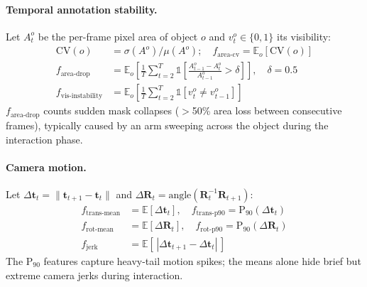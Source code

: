 \paragraph{Temporal annotation stability.}
Let $A^o_t$ be the per-frame pixel area of object $o$ and $v^o_t \in \{0,1\}$ its visibility:
\begin{align}
\text{CV}(o) &= \sigma(A^o)/\mu(A^o); \quad
f_{\text{area-cv}} = \mathbb{E}_o[\text{CV}(o)] \\
f_{\text{area-drop}} &= \mathbb{E}_o\!\left[\frac{1}{T}\textstyle\sum_{t=2}^{T} \mathbb{1}\!\left[\frac{A^o_{t-1} - A^o_t}{A^o_{t-1}} > \delta\right]\right], \quad \delta = 0.5 \\
f_{\text{vis-instability}} &= \mathbb{E}_o\!\left[\frac{1}{T}\textstyle\sum_{t=2}^T \mathbb{1}[v^o_t \neq v^o_{t-1}]\right]
\end{align}
$f_{\text{area-drop}}$ counts sudden mask collapses ($>$50\% area loss between consecutive frames), typically caused by an arm sweeping across the object during the interaction phase.

\paragraph{Camera motion.}
Let $\Delta\mathbf{t}_t = \|\mathbf{t}_{t+1} - \mathbf{t}_t\|$ and $\Delta\mathbf{R}_t = \text{angle}(\mathbf{R}_t^{-1}\mathbf{R}_{t+1})$:
\begin{align}
f_{\text{trans-mean}} &= \mathbb{E}[\Delta\mathbf{t}_t], \quad f_{\text{trans-p90}} = \text{P}_{90}(\Delta\mathbf{t}_t) \\
f_{\text{rot-mean}}   &= \mathbb{E}[\Delta\mathbf{R}_t], \quad f_{\text{rot-p90}}   = \text{P}_{90}(\Delta\mathbf{R}_t) \\
f_{\text{jerk}}       &= \mathbb{E}[\,|\Delta\mathbf{t}_{t+1} - \Delta\mathbf{t}_t|\,]
\end{align}
The $\text{P}_{90}$ features capture heavy-tail motion spikes; the means alone hide brief but extreme camera jerks during interaction.

